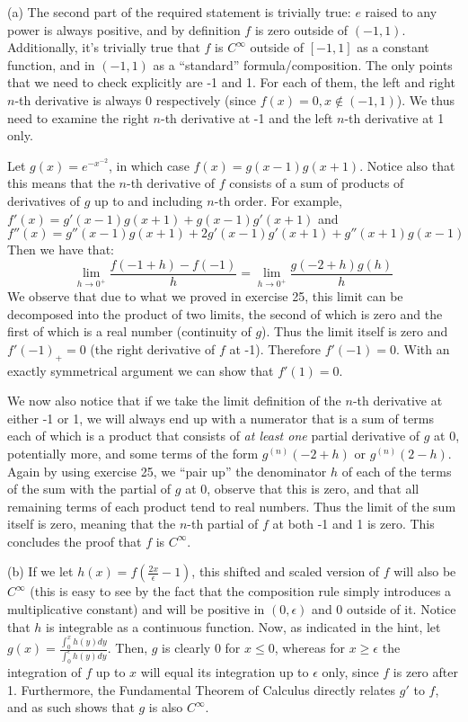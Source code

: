 \begin{solution}

    (a) The second part of the required statement is trivially true: $e$ raised to any power is always positive, and by definition $f$ is zero outside of $(-1, 1)$. 
    Additionally, it's trivially true that $f$ is $C^{\infty}$ outside of $[-1, 1]$ as a constant function, and in $(-1, 1)$ as a ``standard'' formula/composition.
    The only points that we need to check explicitly are -1 and 1.
    For each of them, the left and right $n$-th derivative is always 0 respectively (since $f(x) = 0, x \notin (-1, 1)$).
    We thus need to examine the right $n$-th derivative at -1 and the left $n$-th derivative at 1 only.

    Let $g(x) = e^{-x^{-2}}$, in which case $f(x) = g(x-1)g(x+1)$.
    Notice also that this means that the $n$-th derivative of $f$ consists of a sum of products of derivatives of $g$ up to and including $n$-th order.
    For example, $f'(x) = g'(x-1)g(x+1) + g(x-1)g'(x+1)$ and 
    $$f''(x) = g''(x-1)g(x+1) + 2g'(x-1)g'(x+1) + g''(x+1)g(x-1)$$
    Then we have that:
    $$\lim_{h \rightarrow 0^+} \frac{f(-1 + h) - f(-1)}{h} = \lim_{h \rightarrow 0^+} \frac{g(-2 + h)g(h)}{h}$$
    We observe that due to what we proved in exercise 25, this limit can be decomposed into the product of two limits, the second of which is zero and the first of which is a real number (continuity of $g$).
    Thus the limit itself is zero and $f'(-1)_{+} = 0$ (the right derivative of $f$ at -1).
    Therefore $f'(-1) = 0$.
    With an exactly symmetrical argument we can show that $f'(1) = 0$.
    
    We now also notice that if we take the limit definition of the $n$-th derivative at either -1 or 1, we will always end up with a numerator that is a sum of terms each of which is a product that consists of \textit{at least one} partial derivative of $g$ at 0, potentially more, and some terms of the form $g^{(n)}(-2 + h)$ or $g^{(n)}(2 - h)$.
    Again by using exercise 25, we ``pair up'' the denominator $h$ of each of the terms of the sum with the partial of $g$ at 0, observe that this is zero, and that all remaining terms of each product tend to real numbers. 
    Thus the limit of the sum itself is zero, meaning that the $n$-th partial of $f$ at both -1 and 1 is zero. 
    This concludes the proof that $f$ is $C^{\infty}$.

    (b) If we let $h(x) = f(\frac{2x}{\epsilon} - 1)$, this shifted and scaled version of $f$ will also be $C^{\infty}$ (this is easy to see by the fact that the composition rule simply introduces a multiplicative constant) and will be positive in $(0, \epsilon)$ and 0 outside of it. 
    Notice that $h$ is integrable as a continuous function. 
    Now, as indicated in the hint, let $g(x) = \frac{\int_{0}^{x} h(y)dy}{\int_{0}^{\epsilon} h(y) dy}$.
    Then, $g$ is clearly 0 for $x \leq 0$, whereas for $x \geq \epsilon$ the integration of $f$ up to $x$ will equal its integration up to $\epsilon$ only, since $f$ is zero after 1.
    Furthermore, the Fundamental Theorem of Calculus directly relates $g'$ to $f$, and as such shows that $g$ is also $C^{\infty}$.


\end{solution}
